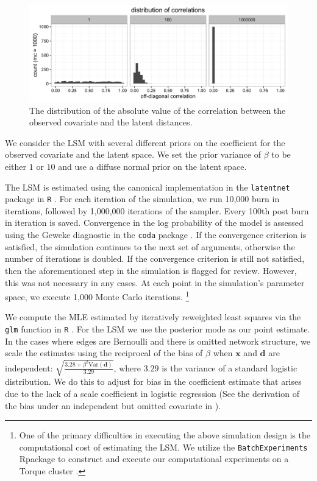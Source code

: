 \documentclass[11pt]{article}
\newcommand{\R}{\textsf{R}\space} %
\begin{document}
\begin{figure}
\includegraphics[width=\textwidth]{figures/max_r_vine.png}
\caption{The distribution of the absolute value of the correlation between the observed covariate and the latent distances. \label{fig:vine}}
\end{figure}

We consider the LSM with several different priors on the coefficient
for the observed covariate and the latent space. We set the prior
variance of $\beta$ to be either $1$ or $10$ and use a diffuse normal
prior on the latent space.

The LSM is estimated using the canonical implementation in the
\texttt{latentnet} package in \texttt{R} \citep{latentnet}. For each
iteration of the simulation, we run 10,000 burn in iterations,
followed by 1,000,000 iterations of the sampler. Every 100th post burn
in iteration is saved. Convergence in the log probability of the model
is assessed using the Geweke diagnostic in the \texttt{coda} package
\citep{coda, geweke1991evaluating}. If the convergence criterion is
satisfied, the simulation continues to the next set of arguments,
otherwise the number of iterations is doubled. If the convergence
criterion is still not satisfied, then the aforementioned step in the
simulation is flagged for review. However, this was not necessary in
any cases. At each point in the simulation's parameter space, we
execute 1,000 Monte Carlo iterations. \footnote{One of the primary
  difficulties in executing the above simulation design is the
  computational cost of estimating the LSM. We utilize the
  \texttt{BatchExperiments} \R package to construct and execute our
  computational experiments on a Torque cluster
  \cite{bischl2015batchjobs}.}

We compute the MLE estimated by iteratively reweighted least squares
via the \texttt{glm} function in \texttt{R} \citep{rcore}. For the LSM
we use the posterior mode as our point estimate. In the cases where
edges are Bernoulli and there is omitted network structure, we scale
the estimates using the reciprocal of the bias of $\beta$ when
$\mathbf{x}$ and $\mathbf{d}$ are independent: $\sqrt{\frac{3.28 +
    \beta^2 \text{Var}(\mathbf{d})}{3.29}}$, where $3.29$ is the
variance of a standard logistic distribution. We do this to adjust for
bias in the coefficient estimate that arises due to the lack of a
scale coefficient in logistic regression (See the derivation of the
bias under an independent but omitted covariate in
\cite{mood2010logistic}).
\end{document}
